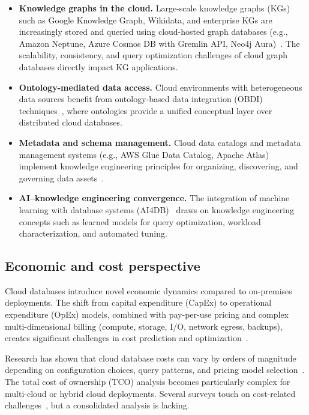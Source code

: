 \documentclass[a4paper,fleqn]{cas-sc}
\begin{document}
\begin{itemize}
    \item \textbf{Knowledge graphs in the cloud.} Large-scale knowledge graphs (KGs) such as Google Knowledge Graph, Wikidata, and enterprise KGs are increasingly stored and queried using cloud-hosted graph databases (e.g., Amazon Neptune, Azure Cosmos DB with Gremlin API, Neo4j Aura)~\cite{Angles2020GraphDB,Elbattah2015Freebase,Coimbra2025GraphDB}. The scalability, consistency, and query optimization challenges of cloud graph databases directly impact KG applications.

    \item \textbf{Ontology-mediated data access.} Cloud environments with heterogeneous data sources benefit from ontology-based data integration (OBDI) techniques~\cite{Xiao2018OBDA}, where ontologies provide a unified conceptual layer over distributed cloud databases.

    \item \textbf{Metadata and schema management.} Cloud data catalogs and metadata management systems (e.g., AWS Glue Data Catalog, Apache Atlas) implement knowledge engineering principles for organizing, discovering, and governing data assets~\cite{Halevy2016Goods}.

    \item \textbf{AI--knowledge engineering convergence.} The integration of machine learning with database systems (AI4DB)~\cite{Zhou2022AI4DB} draws on knowledge engineering concepts such as learned models for query optimization, workload characterization, and automated tuning.
\end{itemize}

\subsection{Economic and cost perspective}
\label{subsec:cost}

Cloud databases introduce novel economic dynamics compared to on-premises deployments. The shift from capital expenditure (CapEx) to operational expenditure (OpEx) models, combined with pay-per-use pricing and complex multi-dimensional billing (compute, storage, I/O, network egress, backups), creates significant challenges in cost prediction and optimization~\cite{Leis2023CloudPricing,Mateljan2010ROI}.

Research has shown that cloud database costs can vary by orders of magnitude depending on configuration choices, query patterns, and pricing model selection~\cite{Leis2023CloudPricing}. The total cost of ownership (TCO) analysis becomes particularly complex for multi-cloud or hybrid cloud deployments. Several surveys touch on cost-related challenges~\cite{Li2024CloudNativeSurvey,Muller2020Serverless}, but a consolidated analysis is lacking.
\end{document}
